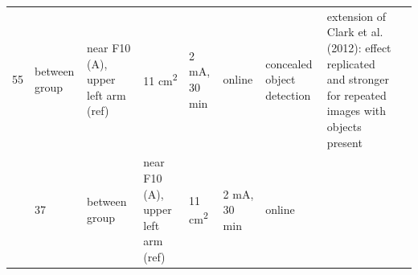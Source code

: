 \documentclass[11pt,]{memoir}
\begin{document}
\begin{longtable}[]{@{}lllllllll@{}}
\begin{minipage}[t]{0.03\columnwidth}
55\strut
\end{minipage} & \begin{minipage}[t]{0.05\columnwidth}\raggedright
between
group\strut
\end{minipage} & \begin{minipage}[t]{0.15\columnwidth}\raggedright
near F10 (A), upper left arm
(ref)\strut
\end{minipage} & \begin{minipage}[t]{0.04\columnwidth}\raggedright
11
cm\textsuperscript{2}\strut
\end{minipage} & \begin{minipage}[t]{0.06\columnwidth}\raggedright
2 mA, 30
min\strut
\end{minipage} & \begin{minipage}[t]{0.05\columnwidth}\raggedright
online\strut
\end{minipage} & \begin{minipage}[t]{0.06\columnwidth}\raggedright
concealed
object
detection\strut
\end{minipage} & \begin{minipage}[t]{0.25\columnwidth}\raggedright
extension of Clark et al. (2012): effect
replicated and stronger for repeated images with
objects present\strut
\end{minipage}\tabularnewline
\begin{minipage}[t]{0.08\columnwidth}\raggedright
\textcite{Falcone2012}\strut
\end{minipage} & \begin{minipage}[t]{0.03\columnwidth}\raggedright
37\strut
\end{minipage} & \begin{minipage}[t]{0.05\columnwidth}\raggedright
between
group\strut
\end{minipage} & \begin{minipage}[t]{0.15\columnwidth}\raggedright
near F10 (A), upper left arm
(ref)\strut
\end{minipage} & \begin{minipage}[t]{0.04\columnwidth}\raggedright
11
cm\textsuperscript{2}\strut
\end{minipage} & \begin{minipage}[t]{0.06\columnwidth}\raggedright
2 mA, 30
min\strut
\end{minipage} & \begin{minipage}[t]{0.05\columnwidth}\raggedright
online\strut
\end{minipage} & \begin{minipage}[t]{0.06\columnwidth}\raggedright

\end{minipage}
\end{longtable}
\end{document}
